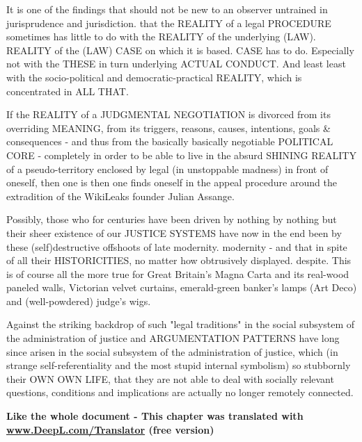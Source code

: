 \begin{multicols}{2}
It is one of the findings that should not be new to an observer untrained in jurisprudence and jurisdiction.
that the REALITY of a legal PROCEDURE sometimes has little to do with the REALITY of the underlying (LAW).
REALITY of the (LAW) CASE on which it is based.
CASE has to do. Especially not with the THESE
in turn underlying ACTUAL CONDUCT. And least
least with the socio-political and democratic-practical REALITY, which is concentrated in ALL THAT.

If the REALITY of a JUDGMENTAL NEGOTIATION is divorced from its overriding MEANING, from its triggers, reasons, causes, intentions, goals \& consequences - and thus from the basically
basically negotiable POLITICAL CORE - completely
in order to be able to live in the absurd SHINING REALITY of a pseudo-territory enclosed by legal
(in unstoppable madness) in front of oneself, then one is
then one finds oneself in the appeal procedure around the extradition of the WikiLeaks founder
Julian Assange.

Possibly, those who for centuries have been driven by nothing
by nothing but their sheer existence of our JUSTICE SYSTEMS have now in the end been
by these (self)destructive offshoots of late modernity.
modernity - and that in spite of all their HISTORICITIES, no matter how obtrusively displayed.
despite. This is of course all the more true for Great Britain's
Magna Carta and its real-wood paneled walls, Victorian velvet curtains, emerald-green banker's lamps (Art Deco) and (well-powdered) judge's wigs.

Against the striking backdrop of such "legal traditions"
in the social subsystem of the administration of justice
and ARGUMENTATION PATTERNS have long since arisen in the social subsystem of the administration of justice, which (in strange self-referentiality and the most stupid internal symbolism) so stubbornly
their OWN OWN LIFE, that they are not able to deal with
socially relevant questions, conditions and implications are actually no longer remotely connected.

\textbf{Like the whole document - This chapter was translated with \url{www.DeepL.com/Translator} (free version)}



\end{multicols}
